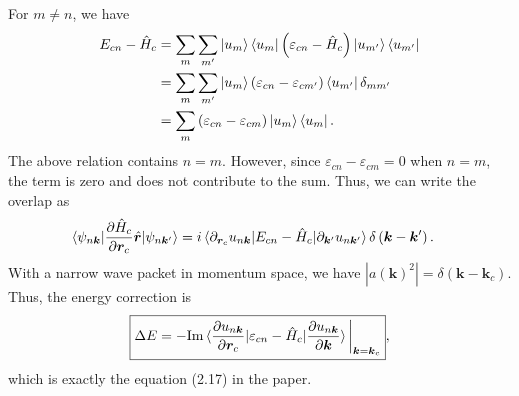 \documentclass[12pt, oneside]{article}
\newcommand{\pr}{\prime}
\newcommand{\pa}{\partial}
\newcommand{\mr}[1]{\mathrm{#1}}
\newcommand{\p}[1]{\left(#1\right)}
\newcommand{\bv}[1]{\left|#1\right|}
\numberwithin{equation}{subsection}
\begin{document}
For \(m \neq n\), we have 
\begin{align}
	\begin{split}
		E_{cn} - \hat{H}_c & = \sum_{m} \sum_{m^\pr} \ket{u_m}\bra{u_m} \p{\varepsilon_{cn} - \hat{H}_c} \ket{u_{m^\pr}} \bra{u_{m^\pr}} \\
		& =  \sum_{m} \sum_{m^\pr} \ket{u_m} \p{\varepsilon_{cn} - \varepsilon_{cm^\pr}} \bra{u_{m^\pr}} \delta_{mm^\pr} \\
		& = \sum_{m} \p{\varepsilon_{cn} - \varepsilon_{cm}}  \ket{u_m}\bra{u_m}.
	\end{split}
\end{align}
The above relation contains \(n= m\). However, since \(\varepsilon_{cn} - \varepsilon_{cm} = 0\) when \(n = m\), the term is zero and does not contribute to the sum. Thus, we can write the overlap as
\begin{align}
	\braket{\psi_{n \bm{k}}| \frac{\pa \hat{H}_c}{\pa \bm{r}_c} \hat{\bm{r}} | \psi_{n \bm{k}^\pr}} & = i \braket{\pa_{\bm{r}_c} u_{n \bm{k}}| E_{cn} - \hat{H}_c | \pa_{\bm{k}^\pr} u_{n \bm{k}^\pr}} \delta \p{\bm{k} - \bm{k}^\pr}.
\end{align}
With a narrow wave packet in momentum space, we have \(\bv{a \p{\bm{k}}^2} = \delta\p{\bm{k} - \bm{k}_c}\). Thus, the energy correction is
\begin{align}
	\boxed{\Delta E = - \mr{Im} \braket{\frac{\pa u_{n \bm{k}}}{\pa \bm{r}_c} | \varepsilon_{cn} - \hat{H}_c | \frac{\pa u_{n \bm{k}}}{\pa \bm{k}}} \bigg|_{\bm{k} = \bm{k}_c}},
\end{align}
which is exactly the equation (2.17) in the paper. 
\end{document}
